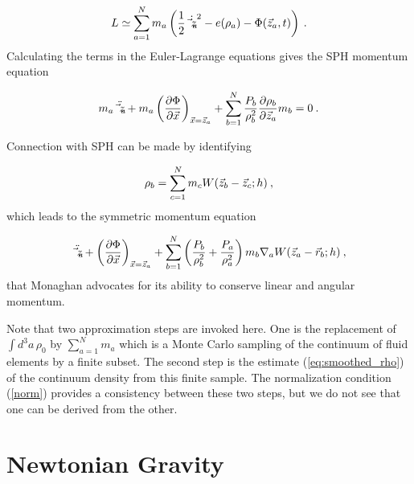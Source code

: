 \begin{equation}
    L \simeq \sum_{a=1}^{N} m_a \left( \frac{1}{2} {\dot {\vec z_a}}^2 -
    e(\rho_a)  - \Phi(\vec z_a, t) \right) \: .
\end{equation}
%
Calculating the terms in the Euler-Lagrange equations gives the SPH
momentum equation

\begin{equation}
    m_a \ddot {\vec z_a}  + m_a \left( \frac{\partial \Phi}{\partial
                                    {\vec x}} \right)_{{\vec x} = {\vec z}_a}
    + \sum_{b=1}^{N} \frac{P_b}{\rho_b^2}
    \frac{\partial \rho_b}{\partial {\vec z_a}} m_b
    = 0 \: .
\end{equation}


Connection with SPH can be made by identifying

\begin{equation}\label{eq:smoothed_rho}
    \rho_b = \sum_{c=1}^{N} m_c W ( {\vec z_b} - {\vec z_c}; h ) \: ,
\end{equation}
%
which leads to the symmetric momentum equation

\begin{equation}\label{eq:sym_sph}
    {\ddot {\vec z_a}}  + \left( \frac{\partial \Phi}{\partial
                                    {\vec x}} \right)_{{\vec x} = {\vec z}_a}
    + \sum_{b=1}^{N} \left( \frac{P_b}{\rho_b^2} +
    \frac{P_a}{\rho_a^2} \right) m_b \nabla_a W ( {\vec z_a} - {\vec
    r_b}; h ) \: ,
\end{equation}
%
that Monaghan \cite{A:JJM92,A:GM82,A:PJM91} advocates for its ability to
conserve linear and angular momentum.

Note that two approximation steps are invoked here.  One is the replacement of
$\int\!\! d^3a\,\rho_0$ by $\sum_{a=1}^N m_a$ which is a Monte Carlo sampling
of the continuum of fluid elements by a finite subset.  The second step is the
estimate (\ref{eq:smoothed_rho}) of the continuum density from this finite
sample.  The normalization condition (\ref{norm}) provides a consistency
between these two steps, but we do not see that one can be derived from
the other.

\section{Newtonian Gravity}\label{Newton}


